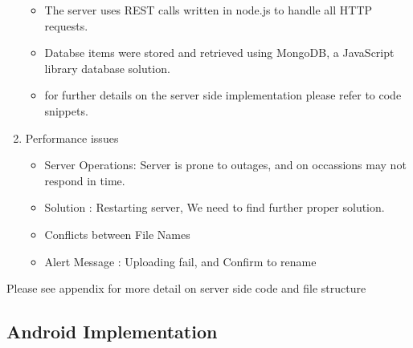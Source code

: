 \documentclass[11pt]{article}
\begin{document}
\begin{enumerate}
\begin{itemize}
     \item The server uses REST calls written in node.js to handle all HTTP requests.
     \item Databse items were stored and retrieved using MongoDB, a JavaScript library database solution.
     \item for further details on the server side implementation please refer to code snippets.
   \end{itemize}
   \item Performance issues
   \begin{itemize}
     \item Server Operations:  Server is prone to outages, and on occassions may not respond in time.
    \item Solution : Restarting server, We need to find further proper solution.
    \item Conflicts between File Names
    \item Alert Message : Uploading fail, and Confirm to rename
   \end{itemize}
\end{enumerate}


Please see appendix for more detail on server side code and file structure
  
\subsection{Android Implementation}
\end{document}
